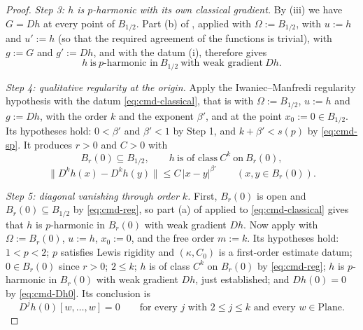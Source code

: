 \begin{proof}
\medskip\noindent\emph{Step 3: $h$ is $p$-harmonic with its own classical gradient.}
By (iii) we have $G=Dh$ at every point of $B_{1/2}$.  Part (b) of ,
applied with $\Omega:=B_{1/2}$, with $u:=h$ and $u':=h$ (so that the required agreement of the
functions is trivial), with $g:=G$ and $g':=Dh$, and with the datum (i), therefore gives
\begin{equation}\label{eq:cmd-classical}
  h\ \text{is}\ p\text{-harmonic in}\ B_{1/2}\ \text{with weak gradient}\ Dh .
\end{equation}

\medskip\noindent\emph{Step 4: qualitative regularity at the origin.}
Apply the Iwaniec--Manfredi regularity hypothesis  with the datum
\eqref{eq:cmd-classical}, that is with $\Omega:=B_{1/2}$, $u:=h$ and $g:=Dh$, with the order $k$
and the exponent $\beta'$, and at the point $x_0:=0\in B_{1/2}$.  Its hypotheses hold:
$0<\beta'$ and $\beta'<1$ by Step 1, and $k+\beta'<s(p)$ by \eqref{eq:cmd-sp}.  It produces
$r>0$ and $C>0$ with
\begin{equation}\label{eq:cmd-reg}
  B_r(0)\subseteq B_{1/2},\qquad h\ \text{is of class}\ C^{k}\ \text{on}\ B_r(0),
\end{equation}
\begin{equation}\label{eq:cmd-hol}
  \bigl\lVert D^{k}h(x)-D^{k}h(y)\bigr\rVert\le C\,\lvert x-y\rvert^{\beta'}
  \qquad(x,y\in B_r(0)).
\end{equation}

\medskip\noindent\emph{Step 5: diagonal vanishing through order $k$.}
First, $B_r(0)$ is open and $B_r(0)\subseteq B_{1/2}$ by \eqref{eq:cmd-reg}, so part (a) of
 applied to \eqref{eq:cmd-classical} gives that $h$ is $p$-harmonic in
$B_r(0)$ with weak gradient $Dh$.  Now apply  with $\Omega:=B_r(0)$, $u:=h$,
$x_0:=0$, and the free order $m:=k$.  Its hypotheses hold: $1<p<2$; $p$ satisfies Lewis rigidity
and $(\kappa,C_0)$ is a first-order estimate datum; $0\in B_r(0)$ since $r>0$; $2\le k$; $h$ is
of class $C^{k}$ on $B_r(0)$ by \eqref{eq:cmd-reg}; $h$ is $p$-harmonic in $B_r(0)$ with weak
gradient $Dh$, just established; and $Dh(0)=0$ by \eqref{eq:cmd-Dh0}.  Its conclusion is
\begin{equation}\label{eq:cmd-rig}
  D^{j}h(0)[w,\ldots,w]=0\qquad\text{for every }j\text{ with }2\le j\le k
  \text{ and every }w\in\mathrm{Plane}.
\end{equation}


\end{proof}
